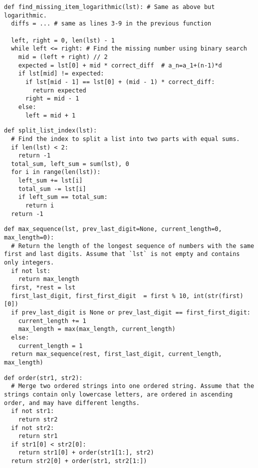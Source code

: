 \documentclass[11pt]{article}
\begin{document}
\begin{lstlisting}
def find_missing_item_logarithmic(lst): # Same as above but logarithmic.
  diffs = ... # same as lines 3-9 in the previous function

  left, right = 0, len(lst) - 1
  while left <= right: # Find the missing number using binary search
    mid = (left + right) // 2
    expected = lst[0] + mid * correct_diff  # a_n=a_1+(n-1)*d
    if lst[mid] != expected:
      if lst[mid - 1] == lst[0] + (mid - 1) * correct_diff:
        return expected
      right = mid - 1
    else:
      left = mid + 1
\end{lstlisting}

\begin{lstlisting}
def split_list_index(lst):
  # Find the index to split a list into two parts with equal sums.
  if len(lst) < 2:
    return -1
  total_sum, left_sum = sum(lst), 0
  for i in range(len(lst)):
    left_sum += lst[i]
    total_sum -= lst[i]
    if left_sum == total_sum:
      return i
  return -1
\end{lstlisting}

\begin{lstlisting}
def max_sequence(lst, prev_last_digit=None, current_length=0, max_length=0):
  # Return the length of the longest sequence of numbers with the same first and last digits. Assume that `lst` is not empty and contains only integers.
  if not lst:
    return max_length
  first, *rest = lst
  first_last_digit, first_first_digit  = first % 10, int(str(first)[0])
  if prev_last_digit is None or prev_last_digit == first_first_digit:
    current_length += 1
    max_length = max(max_length, current_length)
  else:
    current_length = 1
  return max_sequence(rest, first_last_digit, current_length, max_length)
\end{lstlisting}

\begin{lstlisting}
def order(str1, str2):
  # Merge two ordered strings into one ordered string. Assume that the strings contain only lowercase letters, are ordered in ascending order, and may have different lengths.
  if not str1:
    return str2
  if not str2:
    return str1
  if str1[0] < str2[0]:
    return str1[0] + order(str1[1:], str2)
  return str2[0] + order(str1, str2[1:])
\end{lstlisting}

\end{document}
